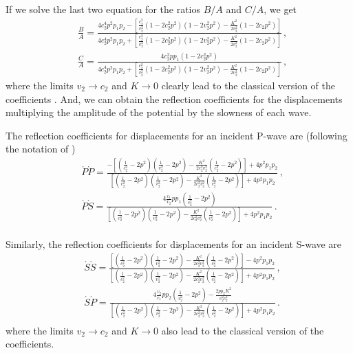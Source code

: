 \documentclass[12pt]{article}
\begin{document}
If we solve the last two equation for the ratios \(B/A\) and \(C/A\), we get
\begin{align*}
&\frac{B}{A} = \frac{4c_2^4 p^2 p_1 p_2 - \left[\frac{c_2^2}{v_2^2}(1 - 2c_2^2 p^2)(1 - 2v_2^2 p^2) - \frac{K^2}{2v_2^2}(1 - 2c_2 p^2)\right]} {4c_2^4 p^2 p_1 p_2 + \left[\frac{c_2^2}{v_2^2}(1 - 2c_2^2 p^2)(1 - 2v_2^2 p^2) - \frac{K^2}{2v_2^2}(1 - 2c_2 p^2)\right]}\, ,\\
&\frac{C}{A} = \frac{4c_2^2 p p_1 (1 - 2c_2^2 p^2)} {4c_2^4 p^2 p_1 p_2 + \left[\frac{c_2^2}{v_2^2}(1 - 2c_2^2 p^2)(1 - 2v_2^2 p^2) - \frac{K^2}{2v_2^2}(1 - 2c_2 p^2)\right]}\, ,
\end{align*}
where the limits \(v_2 \rightarrow c_2\) and \(K \rightarrow 0\) clearly lead to the classical version of the coefficients \citep{AkiAndRichards2002}. And, we can obtain the reflection coefficients for the displacements multiplying the amplitude of the potential by the slowness of each wave.

The reflection coefficients for displacements for an incident P-wave are (following the notation of \citep{AkiAndRichards2002})
\begin{align}
&\acute{P}\grave{P} = \frac{-\left[\left(\frac{1}{c_2^2} - 2 p^2\right)\left(\frac{1}{v_2^2} - 2 p^2\right) - \frac{K^2}{2 c_2^2 v_2^2}\left(\frac{1}{c_2^2} - 2 p^2\right)\right] + 4 p^2 p_1 p_2} {\left[\left(\frac{1}{c_2^2} - 2 p^2\right)\left(\frac{1}{v_2^2} - 2 p^2\right) - \frac{K^2}{2 c_2^2 v_2^2}\left(\frac{1}{c_2^2} - 2 p^2\right)\right] + 4 p^2 p_1 p_2}\, ,\\
&\acute{P}\grave{S} = \frac{4 \frac{c_1}{v_2} p p_1\left(\frac{1}{c_2^2} - 2 p^2\right)} {\left[\left(\frac{1}{c_2^2} - 2 p^2\right)\left(\frac{1}{v_2^2} - 2 p^2\right) - \frac{K^2}{2 c_2^2 v_2^2}\left(\frac{1}{c_2^2} - 2 p^2\right)\right] + 4 p^2 p_1 p_2}\, .\\
\end{align}

Similarly, the reflection coefficients for displacements for an incident S-wave are
\begin{align}
&\acute{S}\grave{S} = \frac{\left[\left(\frac{1}{c_2^2} - 2 p^2\right)\left(\frac{1}{v_2^2} - 2 p^2\right) - \frac{K^2}{2 c_2^2 v_2^2}\left(\frac{1}{c_2^2} - 2 p^2\right)\right] - 4 p^2 p_1 p_2} {\left[\left(\frac{1}{c_2^2} - 2 p^2\right)\left(\frac{1}{v_2^2} - 2 p^2\right) - \frac{K^2}{2 c_2^2 v_2^2}\left(\frac{1}{c_2^2} - 2 p^2\right)\right] + 4 p^2 p_1 p_2}\, ,\\
&\acute{S}\grave{P} = \frac{4 \frac{v_2}{c_1} p p_2\left(\frac{1}{v_2^2} - 2 p^2\right) - \frac{2 p p_2 K^2}{v_2^2 c_2^2}} {\left[\left(\frac{1}{c_2^2} - 2 p^2\right)\left(\frac{1}{v_2^2} - 2 p^2\right) - \frac{K^2}{2 c_2^2 v_2^2}\left(\frac{1}{c_2^2} - 2 p^2\right)\right] + 4 p^2 p_1 p_2}\, .\\
\end{align}
where the limits \(v_2 \rightarrow c_2\) and \(K \rightarrow 0\) also lead to the classical version of the coefficients.
\end{document}
